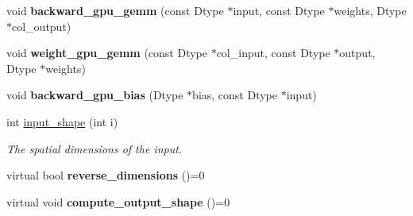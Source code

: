 \begin{DoxyCompactItemize}
\item 
void {\bfseries backward\+\_\+gpu\+\_\+gemm} (const Dtype $\ast$input, const Dtype $\ast$weights, Dtype $\ast$col\+\_\+output)\hypertarget{classcaffe_1_1BaseConvolutionLayer_aece62d609b5fb36990ef6d5c48472efe}{}\label{classcaffe_1_1BaseConvolutionLayer_aece62d609b5fb36990ef6d5c48472efe}

\item 
void {\bfseries weight\+\_\+gpu\+\_\+gemm} (const Dtype $\ast$col\+\_\+input, const Dtype $\ast$output, Dtype $\ast$weights)\hypertarget{classcaffe_1_1BaseConvolutionLayer_a2c2e76ae5046570087f6af56180787b5}{}\label{classcaffe_1_1BaseConvolutionLayer_a2c2e76ae5046570087f6af56180787b5}

\item 
void {\bfseries backward\+\_\+gpu\+\_\+bias} (Dtype $\ast$bias, const Dtype $\ast$input)\hypertarget{classcaffe_1_1BaseConvolutionLayer_abbaf526a70e5106b79d8da94e8d4aa06}{}\label{classcaffe_1_1BaseConvolutionLayer_abbaf526a70e5106b79d8da94e8d4aa06}

\item 
int \hyperlink{classcaffe_1_1BaseConvolutionLayer_a6324d4ab918a7b09399aa85a8a03737d}{input\+\_\+shape} (int i)\hypertarget{classcaffe_1_1BaseConvolutionLayer_a6324d4ab918a7b09399aa85a8a03737d}{}\label{classcaffe_1_1BaseConvolutionLayer_a6324d4ab918a7b09399aa85a8a03737d}

\begin{DoxyCompactList}\small\item\em The spatial dimensions of the input. \end{DoxyCompactList}\item 
virtual bool {\bfseries reverse\+\_\+dimensions} ()=0\hypertarget{classcaffe_1_1BaseConvolutionLayer_affa7a2b5b583afc210f0c5dfe48842c8}{}\label{classcaffe_1_1BaseConvolutionLayer_affa7a2b5b583afc210f0c5dfe48842c8}

\item 
virtual void {\bfseries compute\+\_\+output\+\_\+shape} ()=0\hypertarget{classcaffe_1_1BaseConvolutionLayer_a552f16d43bf2470274102fe4fcde8759}{}\label{classcaffe_1_1BaseConvolutionLayer_a552f16d43bf2470274102fe4fcde8759}

\end{DoxyCompactItemize}
